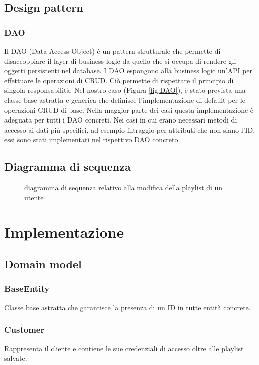 \documentclass{article}
\begin{document}
  \subsection{Design pattern}

  \subsubsection{DAO}
  Il DAO (Data Access Object) è un pattern strutturale che permette di disaccoppiare il layer di business logic da quello che si occupa di rendere gli oggetti persistenti nel database. I DAO espongono alla business logic un'API per effettuare le operazioni di CRUD. Ciò permette di rispettare il principio di singola responsabilità.
  Nel nostro caso (Figura \ref{fig:DAO}), è stato prevista una classe base astratta e generica che definisce l'implementazione di default per le operazioni CRUD di base. Nella maggior parte dei casi questa implementazione è adeguata per tutti i DAO concreti. Nei casi in cui erano necessari metodi di accesso ai dati più specifici, ad esempio filtraggio per attributi che non siano l'ID, essi sono stati implementati nel rispettivo DAO concreto.

  \subsection{Diagramma di sequenza}
  \begin{figure}[H]
    \centering
    
    \caption{diagramma di sequenza relativo alla modifica della playlist di un utente}
    \label{fig:seqDiag}
  \end{figure}


  \section{Implementazione}

  \subsection{Domain model}

  \subsubsection{BaseEntity}
  Classe base astratta che garantisce la presenza di un ID in tutte entità concrete.
  \subsubsection{Customer}
  Rappresenta il cliente e contiene le sue credenziali di accesso oltre alle playlist salvate.
\end{document}
